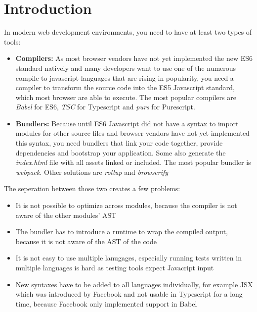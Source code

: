 \section{Introduction}

In modern web development environments, you need to have at least two types of tools:

\begin{itemize}

\item{\textbf{Compilers:} As most browser vendors have not yet implemented the new ES6 standard natively and many developers want to use one of the numerous compile-to-javascript languages that are rising in popularity, you need a compiler to transform the source code into the ES5 Javascript standard, which most browser are able to execute. The most popular compilers are \textit{Babel} for ES6, \textit{TSC} for Typescript and \textit{purs} for Purescript.}

\item{\textbf{Bundlers:} Because until ES6 Javascript did not have a syntax to import modules for other source files and browser vendors have not yet implemented this syntax, you need bundlers that link your code together, provide dependencies and bootstrap your application. Some also generate the \textit{index.html} file with all assets linked or included. The most popular bundler is \textit{webpack}. Other solutions are \textit{rollup} and \textit{browserify}}

\end{itemize}

The seperation between those two creates a few problems:

\begin{itemize}
\item{It is not possible to optimize across modules, because the compiler is not aware of the other modules' AST}

\item{The bundler has to introduce a runtime to wrap the compiled output, because it is not aware of the AST of the code}

\item{It is not easy to use multiple lanugages, especially running tests written in multiple languages is hard as testing tools expect Javacript input}

\item{New syntaxes have to be added to all languages individually, for example JSX which was introduced by Facebook and not usable in Typescript for a long time, because Facebook only implemented support in Babel}

\end{itemize}

